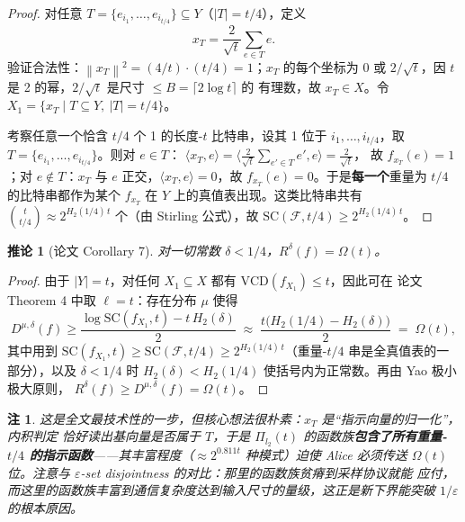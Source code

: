 \documentclass[UTF8, 11pt, a4paper, linestretch=1.15]{ctexart}
\theoremstyle{zhstyle}
\newtheorem{corollary}{推论}
\newtheorem{remark}{注}
\newcommand{\eps}{\varepsilon}
\newcommand{\inner}[2]{\langle #1, #2 \rangle}
\newcommand{\norm}[1]{\left\lVert #1 \right\rVert}
\begin{document}
	\begin{proof}
		对任意 $T = \{e_{i_1}, \dots, e_{i_{t/4}}\} \subseteq Y$（$|T| = t/4$），定义
		\[
		x_T = \frac{2}{\sqrt{t}} \sum_{e \in T} e .
		\]
		验证合法性：$\norm{x_T}^2 = (4/t)\cdot(t/4) = 1$；$x_T$ 的每个坐标为 $0$ 或
		$2/\sqrt{t}$，因 $t$ 是 2 的幂，$2/\sqrt{t}$ 是尺寸 $\leq B = \lceil 2\log t\rceil$ 的
		有理数，故 $x_T \in X$。令 $X_1 = \{x_T \mid T \subseteq Y,\ |T| = t/4\}$。
		
		考察任意一个恰含 $t/4$ 个 1 的长度-$t$ 比特串，设其 1 位于 $i_1, \dots, i_{t/4}$，取
		$T = \{e_{i_1}, \dots, e_{i_{t/4}}\}$。则对 $e \in T$：
		$\inner{x_T}{e} = \inner{\frac{2}{\sqrt{t}}\sum_{e' \in T} e'}{e} = \frac{2}{\sqrt{t}}$，
		故 $f_{x_T}(e) = 1$；对 $e \notin T$：$x_T$ 与 $e$ 正交，$\inner{x_T}{e} = 0$，故
		$f_{x_T}(e) = 0$。于是\textbf{每一个}重量为 $t/4$ 的比特串都作为某个 $f_{x_T}$ 在
		$Y$ 上的真值表出现。这类比特串共有
		$\binom{t}{t/4} \approx 2^{H_2(1/4)\,t}$ 个（由 Stirling 公式），故
		$\mathrm{SC}(\mathcal{F}, t/4) \geq 2^{H_2(1/4)\,t}$。
	\end{proof}
	
	\begin{corollary}[论文 Corollary 7]
		对一切常数 $\delta < 1/4$，$R^{\delta}(f) = \Omega(t)$。
	\end{corollary}
	
	\begin{proof}
		由于 $|Y| = t$，对任何 $X_1 \subseteq X$ 都有 $\mathrm{VCD}(f_{X_1}) \leq t$，因此可在
		论文 Theorem 4 中取 $\ell = t$：存在分布 $\mu$ 使得
		\[
		D^{\mu,\delta}(f) \geq
		\frac{\log \mathrm{SC}(f_{X_1}, t) - t\,H_2(\delta)}{2}
		\;\approx\; \frac{t\big(H_2(1/4) - H_2(\delta)\big)}{2} \;=\; \Omega(t),
		\]
		其中用到 $\mathrm{SC}(f_{X_1}, t) \geq \mathrm{SC}(\mathcal{F}, t/4) \geq
		2^{H_2(1/4)\,t}$（重量-$t/4$ 串是全真值表的一部分），以及 $\delta < 1/4$ 时
		$H_2(\delta) < H_2(1/4)$ 使括号内为正常数。再由 Yao 极小极大原则，
		$R^{\delta}(f) \geq D^{\mu,\delta}(f) = \Omega(t)$。
	\end{proof}
	
	\begin{remark}
		这是全文最技术性的一步，但核心想法很朴素：$x_T$ 是“指示向量的归一化”，内积判定
		恰好读出基向量是否属于 $T$，于是 $\Pi_{l_2}(t)$ 的函数族\textbf{包含了所有重量-$t/4$
			的指示函数}——其丰富程度（$\approx 2^{0.811 t}$ 种模式）迫使 Alice 必须传送
		$\Omega(t)$ 位。注意与 $\eps$-set disjointness 的对比：那里的函数族贫瘠到采样协议就能
		应付，而这里的函数族丰富到通信复杂度达到输入尺寸的量级，这正是新下界能突破
		$1/\eps$ 的根本原因。
	\end{remark}
	
\end{document}
